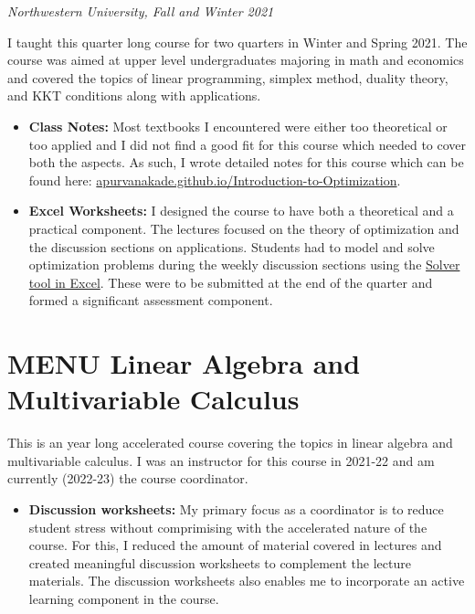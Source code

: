 \documentclass[
]{report}
\providecommand{\tightlist}{%
  \setlength{\itemsep}{0pt}\setlength{\parskip}{0pt}}
\begin{document}
\emph{Northwestern University, Fall and Winter 2021}

I taught this quarter long course for two quarters in Winter and Spring 2021. The course was aimed at upper level undergraduates majoring in math and economics and covered the topics of linear programming, simplex method, duality theory, and KKT conditions along with applications.

\begin{itemize}
\item
  \textbf{Class Notes:}
  Most textbooks I encountered were either too theoretical or too applied and I did not find a good fit for this course which needed to cover both the aspects. As such, I wrote detailed notes for this course which can be found here: \href{https://apurvanakade.github.io/Introduction-to-Optimization/}{apurvanakade.github.io/Introduction-to-Optimization}.
\item
  \textbf{Excel Worksheets:}
  I designed the course to have both a theoretical and a practical component. The lectures focused on the theory of optimization and the discussion sections on applications. Students had to model and solve optimization problems during the weekly discussion sections using the \href{https://support.microsoft.com/en-us/office/load-the-solver-add-in-in-excel-612926fc-d53b-46b4-872c-e24772f078ca}{Solver tool in Excel}. These were to be submitted at the end of the quarter and formed a significant assessment component.
\end{itemize}

\hypertarget{menu-linear-algebra-and-multivariable-calculus}{%
\section{MENU Linear Algebra and Multivariable Calculus}\label{menu-linear-algebra-and-multivariable-calculus}}

This is an year long accelerated course covering the topics in linear algebra and
multivariable calculus. I was an instructor for this course in 2021-22 and am currently (2022-23) the course coordinator.

\begin{itemize}
\tightlist
\item
  \textbf{Discussion worksheets:}
  My primary focus as a coordinator is to reduce student stress without comprimising with the accelerated nature of the course. For this, I reduced the amount of material covered in lectures and created meaningful discussion worksheets to complement the lecture materials. The discussion worksheets also enables me to incorporate an active learning component in the course.
\end{itemize}
\end{document}
